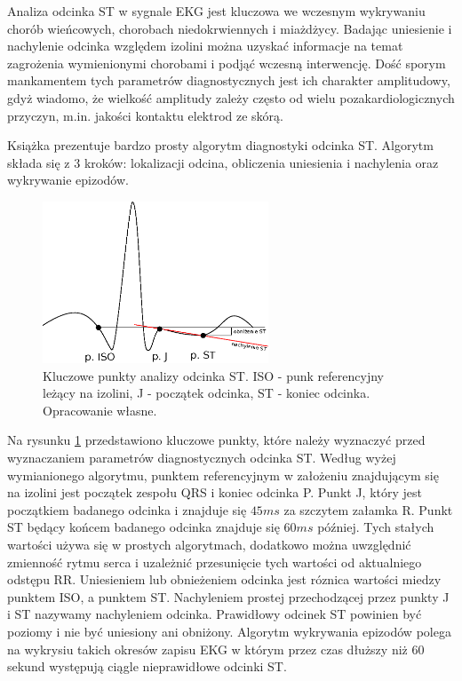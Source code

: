 \documentclass[a4paper, 11pt]{article}
\begin{document}
Analiza odcinka ST w sygnale EKG jest kluczowa we wczesnym wykrywaniu chorób
wieńcowych, chorobach niedokrwiennych i miażdżycy. Badając uniesienie i
nachylenie odcinka względem izolini można uzyskać informacje na temat
zagrożenia wymienionymi chorobami i podjąć wczesną interwencję. Dość sporym
mankamentem tych parametrów diagnostycznych jest ich charakter amplitudowy,
gdyż wiadomo, że wielkość amplitudy zależy często od wielu pozakardiologicznych
przyczyn, m.in. jakości kontaktu elektrod ze skórą.

Książka \cite{AUGUST1} prezentuje bardzo prosty algorytm diagnostyki odcinka
ST. Algorytm składa się z 3 kroków: lokalizacji odcina, obliczenia uniesienia i
nachylenia oraz wykrywanie epizodów.

\begin{figure}[h!]
  \centering
  \includegraphics[width=0.6\textwidth]{include/ecg_st}
  \caption{Kluczowe punkty analizy odcinka ST. ISO - punk referencyjny leżący
  na izolini, J - początek odcinka, ST - koniec odcinka. Opracowanie własne.}
  \label{fig:ecg_st}
\end{figure}

Na rysunku \ref{fig:ecg_st} przedstawiono kluczowe punkty, które należy
wyznaczyć przed wyznaczaniem parametrów diagnostycznych odcinka ST. Według
wyżej wymianionego algorytmu, punktem referencyjnym w założeniu znajdującym się
na izolini jest początek zespołu QRS i koniec odcinka P. Punkt J, który jest
początkiem badanego odcinka i znajduje się $45ms$ za szczytem załamka R. Punkt
ST będący końcem badanego odcinka znajduje się $60ms$ później. Tych stałych
wartości używa się w prostych algorytmach, dodatkowo można uwzględnić zmienność
rytmu serca i uzależnić przesunięcie tych wartości od aktualniego odstępu RR.
Uniesieniem lub obnieżeniem odcinka jest róznica wartości miedzy punktem ISO, a
punktem ST. Nachyleniem prostej przechodzącej przez punkty J i ST nazywamy
nachyleniem odcinka. Prawidłowy odcinek ST powinien być poziomy i nie być
uniesiony ani obniżony. Algorytm wykrywania epizodów polega na wykrysiu takich
okresów zapisu EKG w którym przez czas dłuższy niż 60 sekund występują ciągle
nieprawidłowe odcinki ST.
\end{document}
